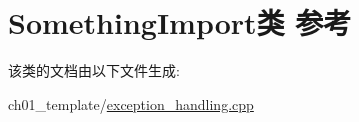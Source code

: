\hypertarget{class_something_import}{}\section{Something\+Import类 参考}
\label{class_something_import}


该类的文档由以下文件生成\+:\begin{DoxyCompactItemize}
\item 
ch01\+\_\+template/\mbox{\hyperlink{exception__handling_8cpp}{exception\+\_\+handling.\+cpp}}\end{DoxyCompactItemize}
